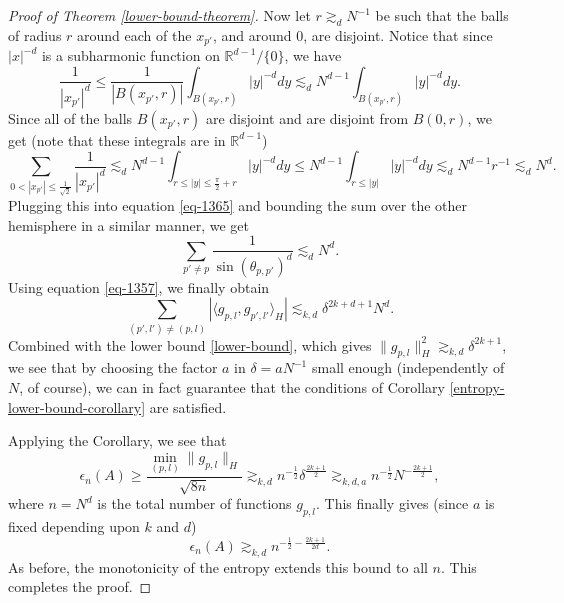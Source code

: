 \begin{proof}[Proof of Theorem \ref{lower-bound-theorem}]
Now let $r\gtrsim_d N^{-1}$ be such that the balls of radius $r$ around each of the $x_{p'}$, and around $0$, are disjoint. Notice that since $|x|^{-d}$ is a subharmonic function on $\mathbb{R}^{d-1} / \{0\}$, we have
\begin{equation}
 \frac{1}{|x_{p'}|^d} \leq \frac{1}{|B(x_{p'},r)|}\int_{B(x_{p'},r)}|y|^{-d}dy \lesssim_d N^{d-1}\int_{B(x_{p'},r)}|y|^{-d}dy.
\end{equation}
Since all of the balls $B(x_{p'},r)$ are disjoint and are disjoint from $B(0,r)$, we get (note that these integrals are in $\mathbb{R}^{d-1}$)
\begin{equation}
 \sum_{0<|x_{p'}|\leq \frac{1}{\sqrt{2}}}\frac{1}{|x_{p'}|^d} \lesssim_d N^{d-1}\int_{r \leq |y| \leq \frac{\pi}{2} + r} |y|^{-d}dy \leq N^{d-1}\int_{r \leq |y|} |y|^{-d}dy \lesssim_d N^{d-1}r^{-1} \lesssim_d N^d.
\end{equation}
Plugging this into equation \eqref{eq-1365} and bounding the sum over the other hemisphere in a similar manner, we get
\begin{equation}
 \sum_{p'\neq p}\frac{1}{\sin(\theta_{p,p'})^d} \lesssim_d N^d.
\end{equation}
Using equation \eqref{eq-1357}, we finally obtain
\begin{equation}
 \sum_{(p',l')\neq (p,l)} |\langle g_{p,l}, g_{p',l'}\rangle_H| \lesssim_{k,d} \delta^{2k+d+1}N^d.
\end{equation}
Combined with the lower bound \eqref{lower-bound}, which gives $\|g_{p,l}\|_H^2 \gtrsim_{k,d} \delta^{2k+1}$, we see that by choosing the factor $a$ in $\delta = aN^{-1}$ small enough (independently of $N$, of course), we can in fact guarantee that the conditions of Corollary \ref{entropy-lower-bound-corollary} are satisfied.

Applying the Corollary, we see that
\begin{equation}
 \epsilon_{n}(A) \geq \frac{\min_{(p,l)} \|g_{p,l}\|_H}{\sqrt{8n}} \gtrsim_{k,d} n^{-\frac{1}{2}} \delta^{\frac{2k+1}{2}} \gtrsim_{k,d,a} n^{-\frac{1}{2}}N^{-\frac{2k+1}{2}},
\end{equation}
where $n = N^d$ is the total number of functions $g_{p,l}$. This finally gives (since $a$ is fixed depending upon $k$ and $d$)
\begin{equation}
 \epsilon_{n}(A)\gtrsim_{k,d} n^{-\frac{1}{2}-\frac{2k+1}{2d}}.
\end{equation}
As before, the monotonicity of the entropy extends this bound to all $n$. This completes the proof.

\end{proof}


